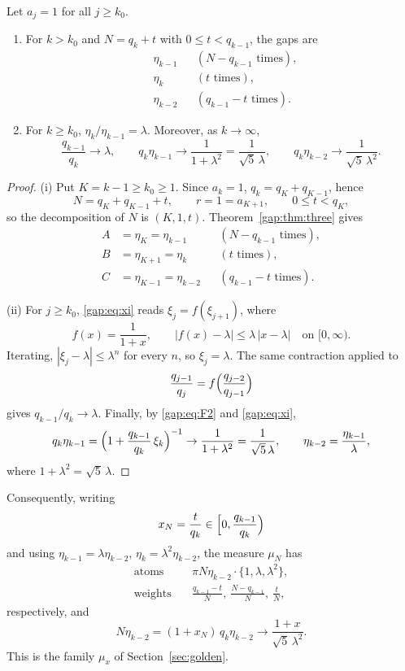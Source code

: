 \begin{corollary}\label{gap:cor:noble}
Let $a_j=1$ for all $j\ge k_0$.
\begin{enumerate}
\item[(i)] For $k>k_0$ and $N=q_k+t$ with $0\le t<q_{k-1}$, the gaps are
\begin{align*}
&\eta_{k-1} &&(N-q_{k-1}\text{ times}),\\
&\eta_k &&(t\text{ times}),\\
&\eta_{k-2} &&(q_{k-1}-t\text{ times}).
\end{align*}
\item[(ii)] For $k\ge k_0$, $\eta_k/\eta_{k-1}=\lambda$. Moreover, as $k\to\infty$,
\[
\frac{q_{k-1}}{q_k}\to\lambda,\qquad
q_k\eta_{k-1}\to\frac1{1+\lambda^2}=\frac1{\sqrt5\,\lambda},\qquad
q_k\eta_{k-2}\to\frac1{\sqrt5\,\lambda^2}.
\]
\end{enumerate}
\end{corollary}
\begin{proof}
(i) Put $K=k-1\ge k_0\ge1$. Since $a_k=1$, $q_k=q_K+q_{K-1}$, hence
\[
N=q_K+q_{K-1}+t,\qquad r=1=a_{K+1},\qquad 0\le t<q_K,
\]
so the decomposition of $N$ is $(K,1,t)$. Theorem~\ref{gap:thm:three} gives
\begin{align*}
A&=\eta_K=\eta_{k-1} &&(N-q_{k-1}\text{ times}),\\
B&=\eta_{K+1}=\eta_k &&(t\text{ times}),\\
C&=\eta_{K-1}=\eta_{k-2} &&(q_{k-1}-t\text{ times}).
\end{align*}

(ii) For $j\ge k_0$, \eqref{gap:eq:xi} reads $\xi_j=f(\xi_{j+1})$, where
\[
f(x)=\frac1{1+x},\qquad |f(x)-\lambda|\le\lambda\,|x-\lambda|\quad\text{on }[0,\infty).
\]
Iterating, $|\xi_j-\lambda|\le\lambda^n$ for every $n$, so $\xi_j=\lambda$.
The same contraction applied to
\[
\frac{q_{j-1}}{q_j}=f\Bigl(\frac{q_{j-2}}{q_{j-1}}\Bigr)
\]
gives $q_{k-1}/q_k\to\lambda$. Finally, by \eqref{gap:eq:F2} and \eqref{gap:eq:xi},
\[
q_k\eta_{k-1}=\Bigl(1+\frac{q_{k-1}}{q_k}\,\xi_k\Bigr)^{-1}\to\frac1{1+\lambda^2}=\frac1{\sqrt5\,\lambda},
\qquad
\eta_{k-2}=\frac{\eta_{k-1}}{\lambda},
\]
where $1+\lambda^2=\sqrt5\,\lambda$.
\end{proof}
Consequently, writing
\[
x_N=\frac t{q_k}\in\Bigl[0,\frac{q_{k-1}}{q_k}\Bigr)
\]
and using $\eta_{k-1}=\lambda\eta_{k-2}$, $\eta_k=\lambda^2\eta_{k-2}$, the measure $\mu_N$ has
\begin{align*}
\text{atoms}&\quad \pi N\eta_{k-2}\cdot\{1,\lambda,\lambda^2\},\\
\text{weights}&\quad \frac{q_{k-1}-t}N,\ \frac{N-q_{k-1}}N,\ \frac tN,
\end{align*}
respectively, and
\[
N\eta_{k-2}=(1+x_N)\,q_k\eta_{k-2}\to\frac{1+x}{\sqrt5\,\lambda^2}.
\]
This is the family $\mu_x$ of Section~\ref{sec:golden}.
